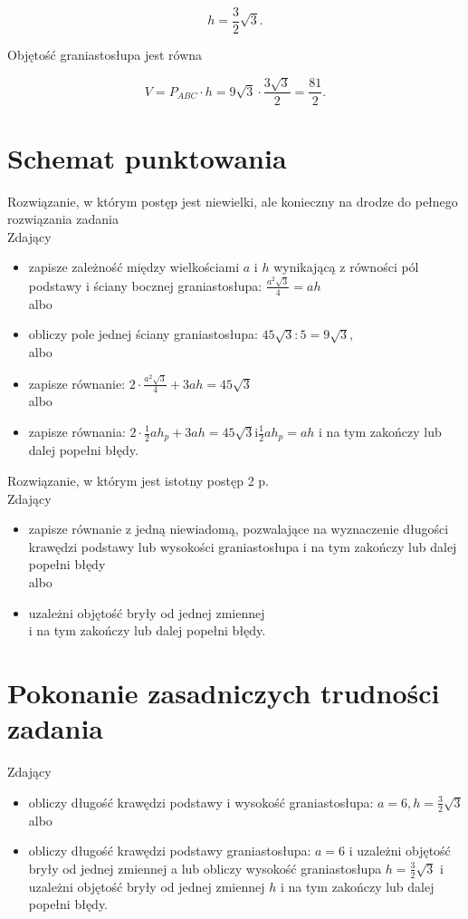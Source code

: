 \documentclass[10pt]{article}
\begin{document}
$$
h=\frac{3}{2} \sqrt{3} .
$$

Objętość graniastosłupa jest równa

$$
V=P_{A B C} \cdot h=9 \sqrt{3} \cdot \frac{3 \sqrt{3}}{2}=\frac{81}{2} .
$$

\section*{Schemat punktowania}
Rozwiązanie, w którym postęp jest niewielki, ale konieczny na drodze do pełnego rozwiązania zadania\\
Zdający

\begin{itemize}
  \item zapisze zależność między wielkościami $a$ i $h$ wynikającą z równości pól podstawy i ściany bocznej graniastosłupa: $\frac{a^{2} \sqrt{3}}{4}=a h$\\
albo
  \item obliczy pole jednej ściany graniastosłupa: $45 \sqrt{3}: 5=9 \sqrt{3}$,\\
albo
  \item zapisze równanie: $2 \cdot \frac{a^{2} \sqrt{3}}{4}+3 a h=45 \sqrt{3}$\\
albo
  \item zapisze równania: $2 \cdot \frac{1}{2} a h_{p}+3 a h=45 \sqrt{3} \mathrm{i} \frac{1}{2} a h_{p}=a h$ i na tym zakończy lub dalej popełni błędy.
\end{itemize}

Rozwiązanie, w którym jest istotny postęp 2 p.\\
Zdający

\begin{itemize}
  \item zapisze równanie z jedną niewiadomą, pozwalające na wyznaczenie długości krawędzi podstawy lub wysokości graniastosłupa i na tym zakończy lub dalej popełni błędy\\
albo
  \item uzależni objętość bryły od jednej zmiennej\\
i na tym zakończy lub dalej popełni błędy.
\end{itemize}

\section*{Pokonanie zasadniczych trudności zadania}
Zdający

\begin{itemize}
  \item obliczy długość krawędzi podstawy i wysokość graniastosłupa: $a=6, h=\frac{3}{2} \sqrt{3}$\\
albo
  \item obliczy długość krawędzi podstawy graniastosłupa: $a=6$ i uzależni objętość bryły od jednej zmiennej a lub obliczy wysokość graniastosłupa $h=\frac{3}{2} \sqrt{3}$ i uzależni objętość bryły od jednej zmiennej $h$ i na tym zakończy lub dalej popełni błędy.
\end{itemize}
\end{document}
